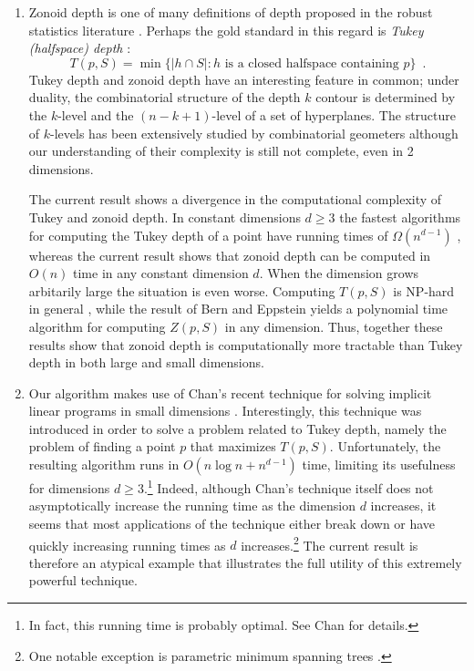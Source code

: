 \documentclass[lotsofwhite]{patmorin}
\begin{document}
\begin{enumerate}
\item Zonoid depth is one of many definitions of depth proposed in the
robust statistics literature \cite{lps99}.  Perhaps the gold
standard in this regard is \emph{Tukey (halfspace) depth} \cite{t74}:
\[
      T(p,S) = \min\{ |h\cap S| : \mbox{$h$ is a closed halfspace
containing $p$} \} \enspace .
\]
Tukey depth and zonoid depth have an interesting feature in common;
under duality, the combinatorial structure of the depth $k$ contour is
determined by the $k$-level and the $(n-k+1)$-level of a set of
hyperplanes. The structure of $k$-levels has been extensively studied
by combinatorial geometers \cite[Chapter~11]{mat02} although our
understanding of their complexity is still not complete, even in 2
dimensions.

The current result shows a divergence in the computational complexity
of Tukey and zonoid depth.  In constant dimensions $d\ge 3$ the
fastest algorithms for computing the Tukey depth of a point have
running times of $\Omega(n^{d-1})$ \cite{c05}, whereas the current
result shows that zonoid depth can be computed in $O(n)$ time in any
constant dimension $d$.  When the dimension grows arbitarily large the
situation is even worse.  Computing $T(p,S)$ is NP-hard in general
\cite{c94}, while the result of Bern and Eppstein \cite{be01} yields a
polynomial time algorithm for computing $Z(p,S)$ in any dimension.
Thus, together these results show that zonoid depth is
computationally more tractable than Tukey depth in both large and
small dimensions.

\item Our algorithm makes use of Chan's recent technique for solving
implicit linear programs in small dimensions \cite{c04}.  Interestingly,
this technique was introduced in order to solve a problem related to
Tukey depth, namely the problem of finding a point $p$ that maximizes
$T(p,S)$.  Unfortunately, the resulting algorithm runs in $O(n\log n +
n^{d-1})$ time, limiting its usefulness for dimensions $d\ge
3$.\footnote{In fact, this running time is probably optimal. See Chan
\cite[Section 1.4]{c04} for details.}  Indeed, although Chan's
technique itself does not asymptotically increase the running time as
the dimension $d$ increases, it seems that most applications of the
technique either break down or have quickly increasing running times
as $d$ increases.\footnote{One notable exception is parametric minimum
spanning trees \cite{e03}.}  The current result is therefore an
atypical example that illustrates the full utility of this extremely
powerful technique.
\end{enumerate}
\end{document}
